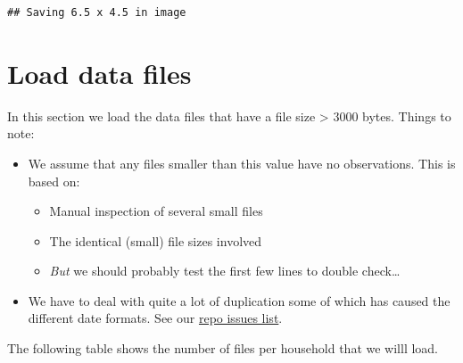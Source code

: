 \documentclass[]{article}
\newenvironment{Shaded}{\begin{snugshade}}{\end{snugshade}}
\newcommand{\KeywordTok}[1]{\textcolor[rgb]{0.13,0.29,0.53}{\textbf{#1}}}
\newcommand{\DataTypeTok}[1]{\textcolor[rgb]{0.13,0.29,0.53}{#1}}
\newcommand{\StringTok}[1]{\textcolor[rgb]{0.31,0.60,0.02}{#1}}
\newcommand{\CommentTok}[1]{\textcolor[rgb]{0.56,0.35,0.01}{\textit{#1}}}
\newcommand{\OperatorTok}[1]{\textcolor[rgb]{0.81,0.36,0.00}{\textbf{#1}}}
\newcommand{\NormalTok}[1]{#1}
\providecommand{\tightlist}{%
  \setlength{\itemsep}{0pt}\setlength{\parskip}{0pt}}
\begin{document}
\begin{verbatim}
## Saving 6.5 x 4.5 in image
\end{verbatim}

\section{Load data files}\label{load-data-files}

In this section we load the data files that have a file size
\textgreater{} 3000 bytes. Things to note:

\begin{itemize}
\tightlist
\item
  We assume that any files smaller than this value have no observations.
  This is based on:

  \begin{itemize}
  \tightlist
  \item
    Manual inspection of several small files
  \item
    The identical (small) file sizes involved
  \item
    \emph{But} we should probably test the first few lines to double
    check\ldots{}
  \end{itemize}
\item
  We have to deal with quite a lot of duplication some of which has
  caused the different date formats. See our
  \href{https://git.soton.ac.uk/ba1e12/nzGREENGrid/issues?scope=all\&utf8=\%E2\%9C\%93\&state=all}{repo
  issues list}.
\end{itemize}

The following table shows the number of files per household that we
willl load.

\begin{Shaded}
\end{Shaded}
\end{document}
